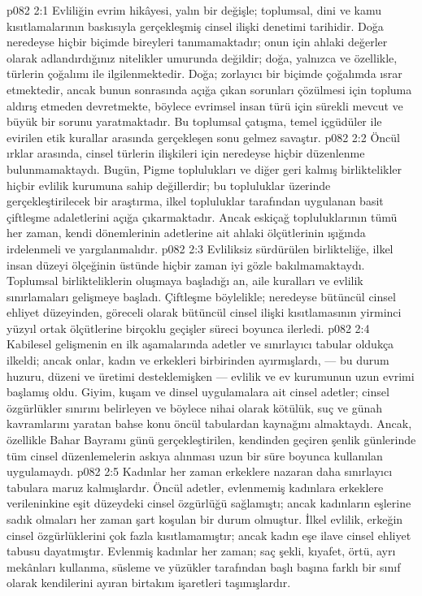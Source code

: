 \vs p082 2:1 Evliliğin evrim hikâyesi, yalın bir değişle; toplumsal, dini ve kamu kısıtlamalarının baskısıyla gerçekleşmiş cinsel ilişki denetimi tarihidir. Doğa neredeyse hiçbir biçimde bireyleri tanımamaktadır; onun için ahlaki değerler olarak adlandırdığınız nitelikler umurunda değildir; doğa, yalnızca ve özellikle, türlerin çoğalımı ile ilgilenmektedir. Doğa; zorlayıcı bir biçimde çoğalımda ısrar etmektedir, ancak bunun sonrasında açığa çıkan sorunları çözülmesi için topluma aldırış etmeden devretmekte, böylece evrimsel insan türü için sürekli mevcut ve büyük bir sorunu yaratmaktadır. Bu toplumsal çatışma, temel içgüdüler ile evirilen etik kurallar arasında gerçekleşen sonu gelmez savaştır.
\vs p082 2:2 Öncül ırklar arasında, cinsel türlerin ilişkileri için neredeyse hiçbir düzenlenme bulunmamaktaydı. Bugün, Pigme toplulukları ve diğer geri kalmış birliktelikler hiçbir evlilik kurumuna sahip değillerdir; bu topluluklar üzerinde gerçekleştirilecek bir araştırma, ilkel topluluklar tarafından uygulanan basit çiftleşme adaletlerini açığa çıkarmaktadır. Ancak eskiçağ topluluklarının tümü her zaman, kendi dönemlerinin adetlerine ait ahlaki ölçütlerinin ışığında irdelenmeli ve yargılanmalıdır.
\vs p082 2:3 Evliliksiz sürdürülen birlikteliğe, ilkel insan düzeyi ölçeğinin üstünde hiçbir zaman iyi gözle bakılmamaktaydı. Toplumsal birlikteliklerin oluşmaya başladığı an, aile kuralları ve evlilik sınırlamaları gelişmeye başladı. Çiftleşme böylelikle; neredeyse bütüncül cinsel ehliyet düzeyinden, göreceli olarak bütüncül cinsel ilişki kısıtlamasının yirminci yüzyıl ortak ölçütlerine birçoklu geçişler süreci boyunca ilerledi.
\vs p082 2:4 Kabilesel gelişmenin en ilk aşamalarında adetler ve sınırlayıcı tabular oldukça ilkeldi; ancak onlar, kadın ve erkekleri birbirinden ayırmışlardı, --- bu durum huzuru, düzeni ve üretimi desteklemişken --- evlilik ve ev kurumunun uzun evrimi başlamış oldu. Giyim, kuşam ve dinsel uygulamalara ait cinsel adetler; cinsel özgürlükler sınırını belirleyen ve böylece nihai olarak kötülük, suç ve günah kavramlarını yaratan bahse konu öncül tabulardan kaynağını almaktaydı. Ancak, özellikle Bahar Bayramı günü gerçekleştirilen, kendinden geçiren şenlik günlerinde tüm cinsel düzenlemelerin askıya alınması uzun bir süre boyunca kullanılan uygulamaydı.
\vs p082 2:5 Kadınlar her zaman erkeklere nazaran daha sınırlayıcı tabulara maruz kalmışlardır. Öncül adetler, evlenmemiş kadınlara erkeklere verileninkine eşit düzeydeki cinsel özgürlüğü sağlamıştı; ancak kadınların eşlerine sadık olmaları her zaman şart koşulan bir durum olmuştur. İlkel evlilik, erkeğin cinsel özgürlüklerini çok fazla kısıtlamamıştır; ancak kadın eşe ilave cinsel ehliyet tabusu dayatmıştır. Evlenmiş kadınlar her zaman; saç şekli, kıyafet, örtü, ayrı mekânları kullanma, süsleme ve yüzükler tarafından başlı başına farklı bir sınıf olarak kendilerini ayıran birtakım işaretleri taşımışlardır.
